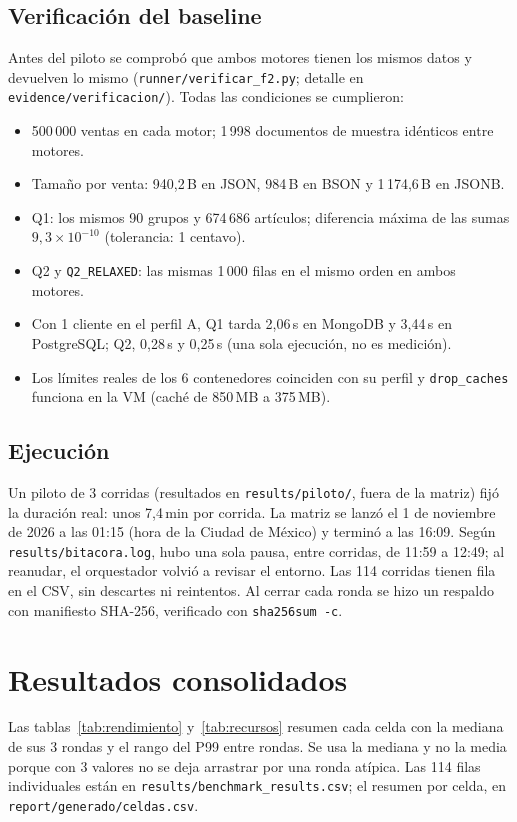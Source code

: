 \documentclass[11pt,a4paper]{article}
\newcommand{\cod}[1]{\texttt{#1}}
\begin{document}
\subsection{Verificación del baseline}
Antes del piloto se comprobó que ambos motores tienen los mismos datos y devuelven lo
mismo (\cod{runner/verificar\_f2.py}; detalle en \cod{evidence/verificacion/}). Todas las
condiciones se cumplieron:
\begin{itemize}
\item 500\,000 ventas en cada motor; 1\,998 documentos de muestra idénticos entre motores.
\item Tamaño por venta: 940,2\,B en JSON, 984\,B en BSON y 1\,174,6\,B en JSONB.
\item Q1: los mismos 90 grupos y 674\,686 artículos; diferencia máxima de las sumas
  $9{,}3\times10^{-10}$ (tolerancia: 1 centavo).
\item Q2 y \cod{Q2\_RELAXED}: las mismas 1\,000 filas en el mismo orden en ambos motores.
\item Con 1 cliente en el perfil A, Q1 tarda 2,06\,s en MongoDB y 3,44\,s en PostgreSQL;
  Q2, 0,28\,s y 0,25\,s (una sola ejecución, no es medición).
\item Los límites reales de los 6 contenedores coinciden con su perfil y
  \cod{drop\_caches} funciona en la VM (caché de 850\,MB a 375\,MB).
\end{itemize}

\subsection{Ejecución}
Un piloto de 3 corridas (resultados en \cod{results/piloto/}, fuera de la matriz) fijó
la duración real: unos 7,4\,min por corrida. La matriz se lanzó el 1 de noviembre de
2026 a las 01:15 (hora de la Ciudad de México) y terminó a las 16:09. Según
\cod{results/bitacora.log}, hubo una sola pausa, entre corridas, de 11:59 a 12:49; al
reanudar, el orquestador volvió a revisar el entorno. Las 114 corridas tienen fila en el
CSV, sin descartes ni reintentos. Al cerrar cada ronda se hizo un respaldo con manifiesto
SHA-256, verificado con \cod{sha256sum -c}.

\section{Resultados consolidados}
Las tablas~\ref{tab:rendimiento} y~\ref{tab:recursos} resumen cada celda con la mediana
de sus 3 rondas y el rango del P99 entre rondas. Se usa la mediana y no la media porque
con 3 valores no se deja arrastrar por una ronda atípica. Las 114 filas individuales están
en \cod{results/benchmark\_results.csv}; el resumen por celda, en
\cod{report/generado/celdas.csv}.
\end{document}
